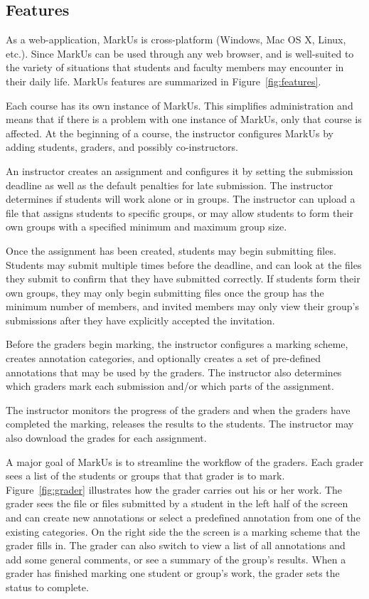 \documentclass[twocolumn,10pt]{asme2e}
\begin{document}
\subsection*{Features}
\label{features}

As a web-application, MarkUs is cross-platform (Windows, Mac OS X, Linux,
etc.). Since MarkUs can be used through any web browser, and is
well-suited to the variety of situations that students and faculty members may
encounter in their daily life. MarkUs features are summarized in Figure~\ref{fig:features}.

Each course has its own instance of MarkUs. This simplifies administration and means that if there is a problem with one instance of MarkUs, only that course is affected. At the beginning of a course, the instructor configures MarkUs by adding students, graders, and possibly co-instructors.

An instructor creates an assignment and configures it by setting the submission deadline as well as the default penalties for late submission. The instructor determines if students will work alone or in groups. The instructor can upload a file that assigns students to specific groups, or may allow students to form their own groups with a specified minimum and maximum group size.

Once the assignment has been created, students may begin submitting files. Students may submit multiple times before the deadline, and can look at the files they submit to confirm that they have submitted correctly. If students form their own groups, they may only begin submitting files once the group has the minimum number of members, and invited members may only view their group's submissions after they have explicitly accepted the invitation.

Before the graders begin marking, the instructor configures a marking scheme, creates annotation categories, and optionally creates a set of pre-defined annotations that may be used by the graders. The instructor also determines which graders mark each submission and/or which parts of the assignment.

The instructor monitors the progress of the graders and when the graders have completed the marking, releases the results to the students. The instructor may also download the grades for each assignment.

A major goal of MarkUs is to streamline the workflow of the graders. Each grader sees a list of the students or groups that that grader is to mark. Figure~\ref{fig:grader} illustrates how the grader carries out his or her work.  The grader sees the file or files submitted by a student in the left half of the screen and can create new annotations or select a predefined annotation from one of the existing categories. On the right side the the screen is a marking scheme that the grader fills in. The grader can also switch to view a list of all annotations and add some general comments, or see a summary of the group's results.  When a grader has finished marking one student or group's work, the grader sets the status to complete.
\end{document}
